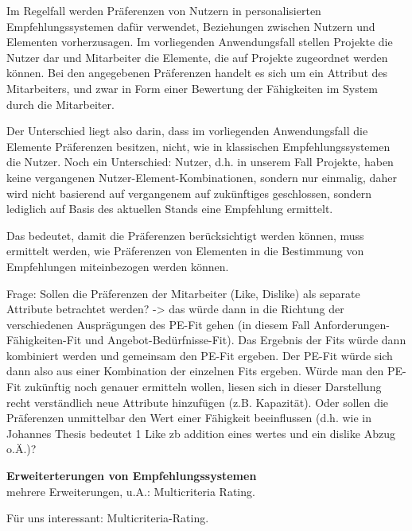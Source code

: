 Im Regelfall werden Präferenzen von Nutzern in personalisierten Empfehlungssystemen dafür verwendet, Beziehungen zwischen Nutzern und Elementen vorherzusagen.
Im vorliegenden Anwendungsfall stellen Projekte die Nutzer dar und Mitarbeiter die Elemente, die auf Projekte zugeordnet werden können.
Bei den angegebenen Präferenzen handelt es sich um ein Attribut des Mitarbeiters, und zwar in Form einer Bewertung der Fähigkeiten im System durch die Mitarbeiter.

Der Unterschied liegt also darin, dass im vorliegenden Anwendungsfall die Elemente Präferenzen besitzen, nicht, wie in klassischen Empfehlungssystemen die Nutzer. %
Noch ein Unterschied: Nutzer, d.h. in unserem Fall Projekte, haben keine vergangenen Nutzer-Element-Kombinationen, sondern nur einmalig, daher wird nicht basierend auf vergangenem auf zukünftiges geschlossen, sondern lediglich auf Basis des aktuellen Stands eine Empfehlung ermittelt.

Das bedeutet, damit die Präferenzen berücksichtigt werden können, muss ermittelt werden, wie Präferenzen von Elementen in die Bestimmung von Empfehlungen miteinbezogen werden können.

Frage: Sollen die Präferenzen der Mitarbeiter (Like, Dislike) als separate Attribute betrachtet werden? -> das würde dann in die Richtung der verschiedenen Ausprägungen des PE-Fit gehen (in diesem Fall Anforderungen-Fähigkeiten-Fit und Angebot-Bedürfnisse-Fit). Das Ergebnis der Fits würde dann kombiniert werden und gemeinsam den PE-Fit ergeben. Der PE-Fit würde sich dann also aus einer Kombination der einzelnen Fits ergeben. Würde man den PE-Fit zukünftig noch genauer ermitteln wollen, liesen sich in dieser Darstellung recht verständlich neue Attribute hinzufügen (z.B. Kapazität).
Oder sollen die Präferenzen unmittelbar den Wert einer Fähigkeit beeinflussen (d.h. wie in Johannes Thesis bedeutet 1 Like zb addition eines wertes und ein dislike Abzug o.Ä.)?

\textbf{Erweiterterungen von Empfehlungssystemen}\\
mehrere Erweiterungen, u.A.: Multicriteria Rating. %

Für uns interessant: Multicriteria-Rating.

